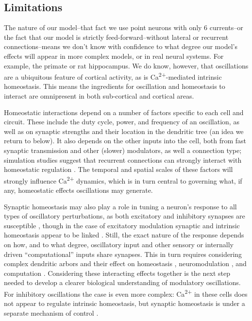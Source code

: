 \documentclass{article}
\begin{document}
\subsection*{Limitations}
The nature of our model--that fact we use point neurons with only 6 currents--or the fact that our model is strictly feed-forward--without lateral or recurrent connections--means we don't know with confidence to what degree our model's effects will appear in more complex models, or in real neural systems. For example, the primate or rat hippocampus. We do know, however, that oscillations are a ubiquitous feature of cortical activity, as is Ca\textsuperscript{2+}-mediated intrinsic homeostasis. This means the ingredients for oscillation and homeostasis to interact are omnipresent in both sub-cortical and cortical areas.

Homeostatic interactions depend on a number of factors specific to each cell and circuit. These include the duty cycle, power, and frequency of an oscillation, as well as on synaptic strengths and their location in the dendritic tree (an idea we return to below). It also depends on the other inputs into the cell, both from fast synaptic transmission and other (slower) modulators, as well a connection type; simulation studies suggest that recurrent connections can strongly interact with homeostatic regulation \cite{Harnack2015}. The temporal and spatial scales of these factors will strongly influence Ca\textsuperscript{2+} dynamics, which is in turn central to governing what, if any, homeostatic effects oscillations may generate.

Synaptic homeostasis may also play a role in tuning a neuron's response to all types of oscillatory perturbations, as both excitatory and inhibitory synapses are susceptible \cite{Cannon2016}, though in the case of excitatory modulation synaptic and intrinsic homeostasis appear to be linked \cite{Joseph2017}. Still, the exact nature of the response depends on how, and to what degree, oscillatory input and other sensory or internally driven ``computational'' inputs share synapses. This in turn requires considering complex dendritic arbors and their effect on homeostasis \cite{LeMasson1993}, neuromodulation \cite{Jadi2012,Jadi2014}, and computation \cite{Mainen1996,Polsky2004,Mel2004}. Considering these interacting effects together is the next step needed to develop a clearer biological understanding of modulatory oscillations. For inhibitory oscillations the case is even more complex: Ca\textsuperscript{2+} in these cells does not appear to regulate intrinsic homeostasis, but synaptic homeostasis is under a separate mechanism of control \cite{Joseph2017}.
\end{document}
